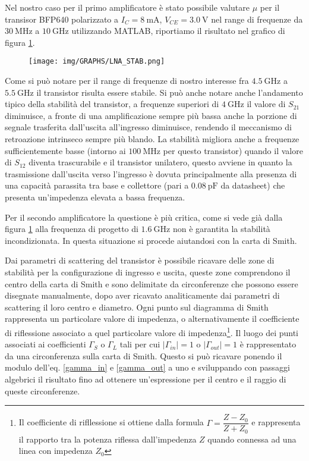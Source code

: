 \documentclass[12pt,oneside]{book}
\begin{document}
Nel nostro caso per il primo amplificatore è stato possibile valutare $\mu$ per il transisor BFP640 polarizzato a $I_{C}=\SI{8}{\milli\ampere}$, $V_{CE}=\SI{3.0}{\volt}$ nel range di frequenze da $\SI{30}{\mega\hertz}$ a $\SI{10}{\giga\hertz}$ utilizzando MATLAB, riportiamo il risultato nel grafico di figura \ref{stab_test}.
\begin{figure}[!htbp]
    \centering
        \texttt{[image: img/GRAPHS/LNA\_STAB.png]}
        \caption{}
        \label{stab_test}
\end{figure}

Come si può notare per il range di frequenze di nostro interesse fra $\SI{4.5}{\giga\hertz}$ a $\SI{5.5}{\giga\hertz}$ il transistor risulta essere stabile. Si può anche notare anche l'andamento tipico della stabilità del transistor, a frequenze superiori di $\SI{4}{\giga\hertz}$ il valore di $S_{21}$ diminuisce, a fronte di una amplificazione sempre più bassa anche la porzione di segnale trasferita dall'uscita all'ingresso diminuisce, rendendo il meccanismo di retroazione intrinseco sempre più blando. La stabilità migliora anche a frequenze sufficientemente basse (intorno ai $\SI{100}{\mega\hertz}$ per questo transistor) quando il valore di $S_{12}$ diventa trascurabile e il transistor unilatero, questo avviene in quanto la trasmissione dall'uscita verso l'ingresso è dovuta principalmente alla presenza di una capacità parassita tra base e collettore (pari a $\SI{0.08}{\pico\farad}$ da datasheet) che presenta un'impedenza elevata a bassa frequenza.

Per il secondo amplificatore la questione è più critica, come si vede già dalla figura \ref{stab_test} alla frequenza di progetto di $\SI{1.6}{\giga\hertz}$ non è garantita la stabilità incondizionata. In questa situazione si procede aiutandosi con la carta di Smith.

Dai parametri di scattering del transistor è possibile ricavare delle zone di stabilità per la configurazione di ingresso e uscita, queste zone comprendono il centro della carta di Smith e sono delimitate da circonferenze che possono essere disegnate manualmente, dopo aver ricavato analiticamente dai parametri di scattering il loro centro e diametro.
Ogni punto sul diagramma di Smith rappresenta un particolare valore di impedenza, o alternativamente il coefficiente di riflessione associato a quel particolare valore di impedenza\footnote{Il coefficiente di rifllessione si ottiene dalla formula $\Gamma=\dfrac{Z-Z_0}{Z+Z_0}$ e rappresenta il rapporto tra la potenza riflessa dall'impedenza $Z$ quando connessa ad una linea con impedenza $Z_0$}. Il luogo dei punti associati ai coefficienti $\Gamma_{S}$ o $\Gamma_{L}$ tali per cui $|\Gamma_{in}| = 1$ o $|\Gamma_{out}| = 1$ è rappresentato da una circonferenza sulla carta di Smith. Questo si può ricavare ponendo il modulo dell'eq. \eqref{gamma_in} e \eqref{gamma_out} a uno e sviluppando con passaggi algebrici il risultato fino ad ottenere un'espressione per il centro e il raggio di queste circonferenze.
\end{document}
